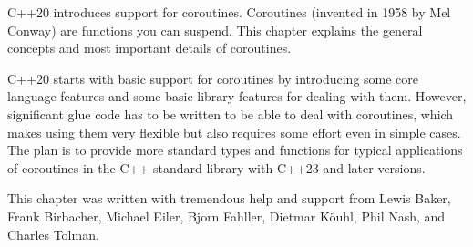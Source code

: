 C++20 introduces support for coroutines. Coroutines (invented in 1958 by Mel Conway) are functions you can suspend. This chapter explains the general concepts and most important details of coroutines.

C++20 starts with basic support for coroutines by introducing some core language features and some basic library features for dealing with them. However, significant glue code has to be written to be able to deal with coroutines, which makes using them very flexible but also requires some effort even in simple cases. The plan is to provide more standard types and functions for typical applications of coroutines in the C++ standard library with C++23 and later versions.

This chapter was written with tremendous help and support from Lewis Baker, Frank Birbacher, Michael Eiler, Bjorn Fahller, Dietmar K{\"o}uhl, Phil Nash, and Charles Tolman.